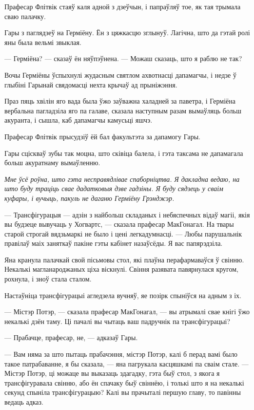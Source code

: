 Прафесар Флітвік стаяў каля адной з дзеўчын, і папраўляў тое, як тая трымала сваю 
палачку.  

Гары з паглядзеў на Герміёну. Ён з цяжкасцю зглынуў. Лагічна, 
што да гэтай ролі яны была вельмі звыклая.

--- Герміёна? --- сказаў ён няўпэўнена. --- Можаш сказаць, што я раблю не так?

Вочы Герміёны ўспыхнулі жудасным святлом ахвотнасці дапамагчы, і недзе ў 
глыбіні Гарынай свядомасці нехта крычаў ад прыніжэння.

Праз пяць хвілін яго вада была ўжо заўважна халадней за паветра, і Герміёна
вербальна пагладзіла яго па галаве, сказала наступным разам вымаўляць больш
акуранта, і сышла, каб дапамагчы камусьці яшчэ.

Прафесар Флітвік прысудзіў ёй бал факультэта за дапамогу Гары.

Гары сціскваў зубы так моцна, што сківіца балела, і гэта таксама не дапамагала 
больш акуратнаму вымаўленню.

\emph{Мне ўсё роўна, што гэта несправядлівае спаборніцтва. Я дакладна ведаю, 
на што буду траціць свае дадатковыя дзве гадзіны. Я буду сядзець у сваім 
куфары, і вучыць, пакуль не даганю Герміёну Грэнджэр.}

\later

--- Трансфігурацыя --- адзін з найбольш складаных і небяспечных відаў магіі,
якія вы будзеце вывучаць у Хогвартс, --- сказала прафесар МакГонагал.
На твары старой строгай вядзьмаркі не было і цені легкадумнасці. --- Любы
парушальнік правілаў маіх заняткаў пакіне гэты кабінет назаўсёды. Я вас папярэдзіла.

Яна кранула палачкай свой пісьмовы стол, які плаўна перафармаваўся ў свінню. Некалькі 
магланароджаных ціха віскнулі. Свіння разявата павярнулася кругом, рохнула, і зноў стала сталом.

Настаўніца трансфігурацыі агледзела вучняў, яе позірк спыніўся на адным з іх.

--- Містэр Потэр, --- сказала прафесар МакГонагал, --- вы атрымалі свае кнігі 
ўжо некалькі дзён таму. Ці пачалі вы чытаць ваш падручнік па трансфігурацыі?

--- Прабачце, прафесар, не, --- адказаў Гары.

--- Вам няма за што пытаць прабачэння, містэр Потэр, калі б перад вамі было такое 
патрабаванне, я бы сказала, --- яна пагрукала касцяшкамі па сваім стале. --- Містэр
Потэр, ці можаце вы выказаць здагадку, гэта быў стол, з якога я трансфігуравала свінню,
або ён спачаку быў свіннёю, і толькі што я на некалькі секунд спыніла трансфігурацыю?
Калі вы прачыталі першую главу, то павінны ведаць адказ.

